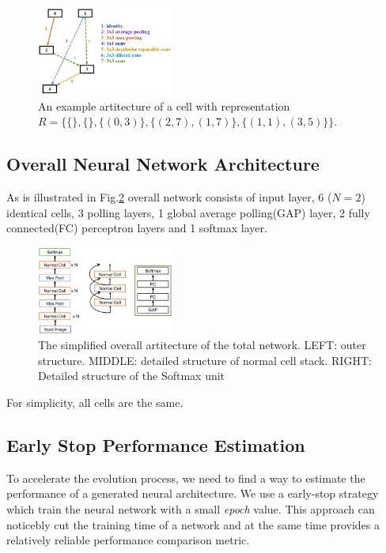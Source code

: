 \documentclass[conference]{IEEEtran}
\begin{document}
  \begin{figure}[H]
 	\centering
 	\includegraphics[width=0.4\textwidth]{figures/cellStruct.png}
   \caption{An example artitecture of a cell with representation $R=\{\{\},\{\},\{(0,3)\},\{(2,7),(1,7)\},\{(1,1),(3,5)\}\}$.}\label{fig:digit}
   \label{f_artc}
  \end{figure}

  \subsection{Overall Neural Network Architecture}
  As is illustrated in Fig.\ref{total_artc} overall network consists of input layer, 6 ($N = 2$) identical cells, 3 polling layers, 1 global average polling(GAP) layer, 2 fully connected(FC) perceptron layers and 1 softmax layer. 

  \begin{figure}[H]
 	\centering
 	\includegraphics[width=0.4\textwidth]{figures/overallStruct.png}
   \caption{The simplified overall artitecture of the total network. LEFT: outer structure. MIDDLE: detailed structure of normal cell stack. RIGHT: Detailed structure of the Softmax unit}\label{fig:digit}
   \label{total_artc}
  \end{figure}

  For simplicity, all cells are the same. 

  \subsection{Early Stop Performance Estimation}

  To accelerate the evolution process, we need to find a way to estimate the performance of a generated neural architecture. We use a early-stop strategy which train the neural network with a small \emph{epoch} value. This approach can noticebly cut the training time of a network and at the same time provides a relatively reliable performance comparison metric.
\end{document}
